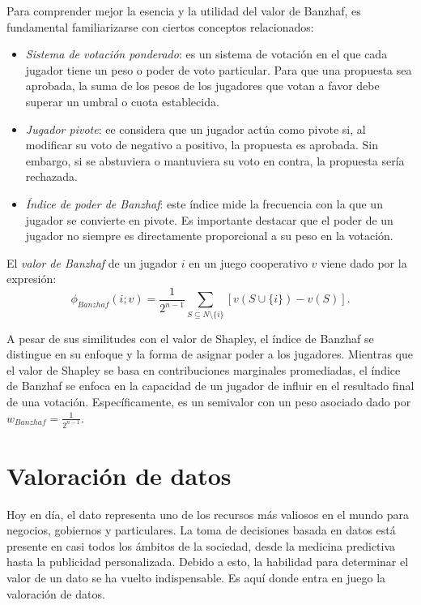 Para comprender mejor la esencia y la utilidad del valor de
Banzhaf, es fundamental familiarizarse con ciertos conceptos
relacionados:

\begin{itemize}
  \item \emph{Sistema de votación ponderado}: es un sistema de
  votación en el que cada jugador tiene un peso o poder de voto
  particular. Para que una propuesta sea aprobada, la suma de los
  pesos de los jugadores que votan a favor debe superar un
  umbral o cuota establecida.

  \item \emph{Jugador pivote}: ee considera que un jugador actúa
  como pivote si, al modificar su voto de negativo a positivo,
  la propuesta es aprobada. Sin embargo, si se abstuviera o
  mantuviera su voto en contra, la propuesta sería rechazada.

  \item \emph{Índice de poder de Banzhaf}: este índice mide la
  frecuencia con la que un jugador se convierte en pivote.
  Es importante destacar que el poder de un jugador no siempre
  es directamente proporcional a su peso en la votación.
\end{itemize}

\begin{definition}
  El \emph{valor de Banzhaf} de un jugador $i$ en un juego
  cooperativo $v$ viene dado por la expresión:
  \begin{equation}
    \label{ec:banzhafFormula}
    \phi_{Banzhaf}(i;v) = \frac{1}{2^{n-1}} \sum_{S
    \subseteq N \setminus \{i\}} [v(S \cup \{i\}) - v(S)].
  \end{equation}
\end{definition}

A pesar de sus similitudes con el valor de Shapley, el índice
de Banzhaf se distingue en su enfoque y la forma de asignar
poder a los jugadores.
Mientras que el valor de Shapley se basa en contribuciones
marginales promediadas, el índice de Banzhaf se enfoca en la
capacidad de un jugador de influir en el resultado final de
una votación. Específicamente, es un semivalor
con un peso asociado dado por $w_{Banzhaf} = \frac{1}{2^{n-1}}$.

\newpage
\section{Valoración de datos}

Hoy en día, el dato representa uno de los recursos más
valiosos en el mundo para negocios, gobiernos y particulares.
La toma de decisiones basada en datos está presente en
casi todos los ámbitos de la sociedad, desde la medicina
predictiva hasta la publicidad personalizada. Debido a
esto, la habilidad para determinar el valor de un dato
se ha vuelto indispensable. Es aquí donde entra
en juego la valoración de datos.

